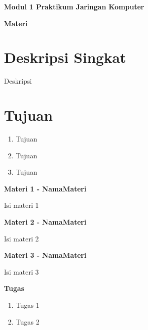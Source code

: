 \documentclass{article}
\begin{document}
    \begin{center}
        \textbf{Modul 1 Praktikum Jaringan Komputer}

        \textbf{Materi}
    \end{center}

    \section*{Deskripsi Singkat}
    Deskripsi

    \section*{Tujuan}
    \begin{enumerate}
        \item Tujuan
        \item Tujuan
        \item Tujuan
    \end{enumerate}

    \begin{flushleft}
        \textbf{Materi 1 - NamaMateri}
        \newline

        Isi materi 1
    \end{flushleft}

    \begin{flushleft}
        \textbf{Materi 2 - NamaMateri}
        \newline

        Isi materi 2
    \end{flushleft}

    \begin{flushleft}
        \textbf{Materi 3 - NamaMateri}
        \newline

        Isi materi 3
    \end{flushleft}

    \newpage
    \begin{flushleft}
        \textbf{Tugas}
        \newline

        \begin{enumerate}
            \item Tugas 1
            \item Tugas 2
        \end{enumerate}
    \end{flushleft}
\end{document}
